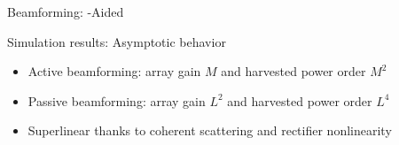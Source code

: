 \documentclass[presentation,xcolor={table},9pt]{beamer}
\begin{document}
\begin{section}{Beamforming: -Aided }
	\begin{frame}{Simulation results: Asymptotic behavior}
		\begin{figure}
			\centering
		\end{figure}
		\begin{itemize}
			\item Active beamforming: array gain $M$ and harvested power order $M^2$
			\item Passive beamforming: array gain $L^2$ and harvested power order $L^4$
			\item Superlinear thanks to coherent scattering and rectifier nonlinearity
		\end{itemize}
	\end{frame}
\end{section}
\end{document}
